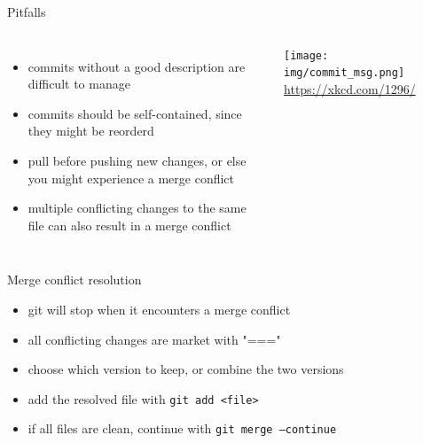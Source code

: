 \documentclass[10pt, graphics, aspectratio=169, table]{beamer}
\begin{document}
    \begin{frame}{Pitfalls}
        \begin{columns}
                \begin{itemize}
                    \item commits without a good description are difficult to manage
                    \item commits should be self-contained, since they might be reorderd
                    \item pull before pushing new changes, or else you might experience a merge conflict
                    \item multiple conflicting changes to the same file can also result in a merge conflict
                \end{itemize}
                \center\texttt{[image: img/commit\_msg.png]}
                \center\tiny\url{https://xkcd.com/1296/}
        \end{columns}
    \end{frame}

    \begin{frame}{Merge conflict resolution}
        \begin{itemize}
            \item git will stop when it encounters a merge conflict
            \item all conflicting changes are market with "==="
            \item choose which version to keep, or combine the two versions
            \item add the resolved file with \texttt{git add <file>}
            \item if all files are clean, continue with \texttt{git merge --continue}
        \end{itemize}
    \end{frame}
\end{document}
